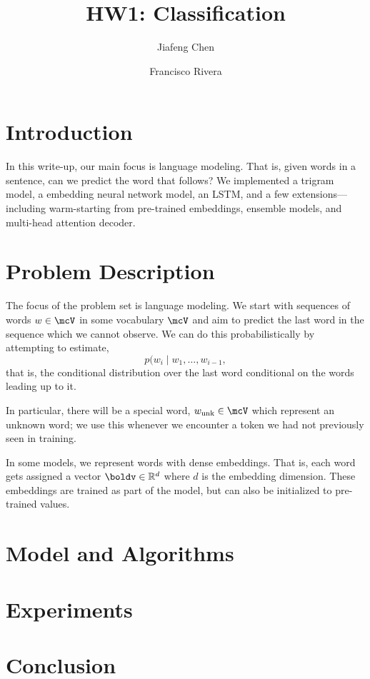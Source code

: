 \documentclass[12pt]{article}
\title{HW1: Classification}
\author{Jiafeng Chen \and
Francisco Rivera}
\begin{document}
\maketitle{}
\section{Introduction}
In this write-up, our main focus is language modeling. That is, given words in a
sentence, can we predict the word that follows? We implemented a trigram model,
a embedding neural network model, an LSTM, and a few extensions---including
warm-starting from pre-trained embeddings, ensemble models, and multi-head
attention decoder. 

\section{Problem Description}

The focus of the problem set is language modeling. We start with sequences of
words $w \in \mcV$ in some vocabulary $\mcV$ and aim to predict the last word in
the sequence which we cannot observe. We can do this probabilistically by
attempting to estimate,
\[ p(w_i \mid w_1, \ldots, w_{i-1},\]
that is, the conditional distribution over the last word conditional on the
words leading up to it.

In particular, there will be a special word, $w_\text{unk} \in \mcV$ which
represent an unknown word; we use this whenever we encounter a token we had not
previously seen in training. 

In some models, we represent words with dense embeddings. That is, each word
gets assigned a vector $\boldv \in \mathbb{R}^d$ where $d$ is the embedding
dimension. These embeddings are trained as part of the model, but can also be
initialized to pre-trained values.

\section{Model and Algorithms}
\section{Experiments}
\section{Conclusion}




\end{document}
